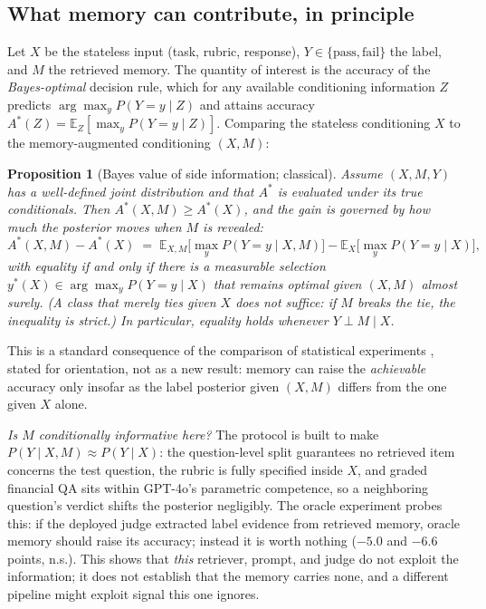 \documentclass[]{ceurart}
\newtheorem{proposition}{Proposition}
\begin{document}
\subsection{What memory can contribute, in principle}
\label{sec:theory}

Let $X$ be the stateless input (task, rubric, response), $Y \in \{\text{pass},\text{fail}\}$ the label, and $M$ the retrieved memory. The quantity of interest is the accuracy of the \emph{Bayes-optimal} decision rule, which for any available conditioning information $Z$ predicts $\arg\max_y P(Y{=}y \mid Z)$ and attains accuracy $A^*(Z) = \mathbb{E}_Z\!\left[\max_y P(Y{=}y \mid Z)\right]$. Comparing the stateless conditioning $X$ to the memory-augmented conditioning $(X,M)$:

\begin{proposition}[Bayes value of side information; classical]
\label{prop:bayes}
Assume $(X, M, Y)$ has a well-defined joint distribution and that $A^*$ is evaluated under its true conditionals. Then $A^*(X,M) \ge A^*(X)$, and the gain is governed by how much the posterior moves when $M$ is revealed:
\[
A^*(X,M) - A^*(X) \;=\; \mathbb{E}_{X,M}\!\big[\max_y P(Y{=}y\mid X,M)\big] - \mathbb{E}_{X}\!\big[\max_y P(Y{=}y\mid X)\big],
\]
with equality if and only if there is a measurable selection $y^{*}(X) \in \arg\max_y P(Y{=}y\mid X)$ that remains optimal given $(X,M)$ almost surely. (A class that merely ties given $X$ does not suffice: if $M$ breaks the tie, the inequality is strict.) In particular, equality holds whenever $Y \perp M \mid X$.
\end{proposition}

This is a standard consequence of the comparison of statistical experiments \citep{blackwell1951, blackwell1953}, stated for orientation, not as a new result: memory can raise the \emph{achievable} accuracy only insofar as the label posterior given $(X,M)$ differs from the one given $X$ alone.

\emph{Is $M$ conditionally informative here?} The protocol is built to make $P(Y\mid X,M)\approx P(Y\mid X)$: the question-level split guarantees no retrieved item concerns the test question, the rubric is fully specified inside $X$, and graded financial QA sits within GPT-4o's parametric competence, so a neighboring question's verdict shifts the posterior negligibly. The oracle experiment probes this: if the deployed judge extracted label evidence from retrieved memory, oracle memory should raise its accuracy; instead it is worth nothing ($-5.0$ and $-6.6$ points, n.s.). This shows that \emph{this} retriever, prompt, and judge do not exploit the information; it does not establish that the memory carries none, and a different pipeline might exploit signal this one ignores.
\end{document}
